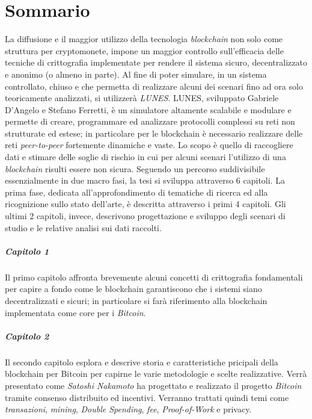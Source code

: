 \chapter*{Sommario}
La diffusione e il maggior utilizzo della tecnologia \textit{blockchain} non solo come struttura per cryptomonete, impone un maggior controllo sull'efficacia delle tecniche di crittografia implementate per rendere il sistema sicuro, decentralizzato e anonimo (o almeno in parte).\newline
Al fine di poter simulare, in un sistema controllato, chiuso e che permetta di realizzare alcuni dei scenari fino ad ora solo teoricamente analizzati, si utilizzerà \textit{LUNES}\cite{gdalunes}.\newline
LUNES, sviluppato Gabriele D'Angelo e Stefano Ferretti, è un simulatore altamente scalabile e modulare e permette di creare, programmare ed analizzare protocolli complessi su reti non strutturate ed estese; in particolare per le blockchain è necessario realizzare delle reti \textit{peer-to-peer} fortemente dinamiche e vaste.\newline
Lo scopo è quello di raccogliere dati e stimare delle soglie di rischio in cui per alcuni scenari l'utilizzo di una \textit{blockchain} risulti essere non sicura.\newline\newline
Seguendo un percorso suddivisibile essenzialmente in due macro fasi, la tesi si sviluppa attraverso 6 capitoli. La prima fase, dedicata all'approfondimento di tematiche di ricerca ed alla ricognizione sullo stato dell'arte, è descritta attraverso i primi 4 capitoli. Gli ultimi 2 capitoli, invece, descrivono progettazione e sviluppo degli scenari di studio e le relative analisi sui dati raccolti.

\paragraph{Capitolo 1}
Il primo capitolo affronta brevemente alcuni concetti di crittografia fondamentali per capire a fondo come le blockchain garantiscono che i sistemi siano decentralizzati e sicuri; in particolare si farà riferimento alla blockchain implementata come core per i \textit{Bitcoin}.

\paragraph{Capitolo 2}
Il secondo capitolo esplora e descrive storia e caratteristiche pricipali della blockchain per Bitcoin per capirne le varie metodologie e scelte realizzative. Verrà presentato come \textit{Satoshi Nakamoto} ha progettato e realizzato il progetto \textit{Bitcoin} tramite consenso distribuito ed incentivi. Verranno trattati quindi temi come \textit{transazioni}, \textit{mining}, \textit{Double Spending}, \textit{fee}, \textit{Proof-of-Work} e privacy.

